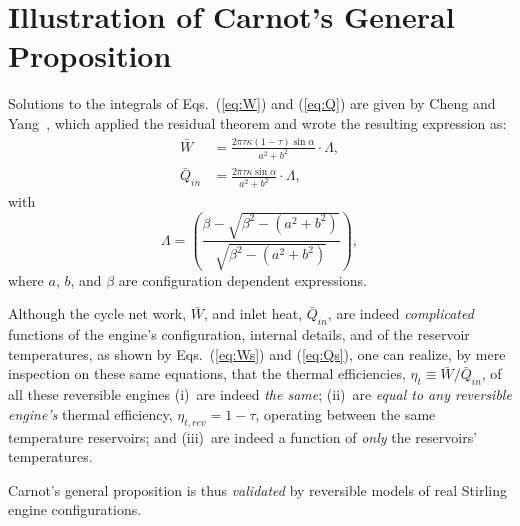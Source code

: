 \section{Illustration of Carnot's General Proposition}

    Solutions to the integrals of Eqs.~(\ref{eq:W}) and (\ref{eq:Q})  are  given  by  Cheng  and
    Yang~\cite{2012-ChengCH+YangHS-ApEnergy}, which applied the residual theorem and  wrote  the
    resulting expression as:
    \begin{align}
        \label{eq:Ws}
        \bar{W} &= \frac{2\pi\tau\kappa(1 - \tau)\sin\alpha}{a^2 + b^2}\cdot\Lambda,\\
        \label{eq:Qs}
        \bar{Q}_{in} &= \frac{2\pi\tau\kappa\sin\alpha}{a^2 + b^2}\cdot\Lambda,
    \end{align}
    \noindent with
    \begin{equation}
        \label{eq:Lamda}
        \Lambda = \left(
                \frac{\beta - \sqrt{\beta^2 - (a^2 + b^2)}}{\sqrt{\beta^2 - (a^2 + b^2)}}
            \right),
    \end{equation}
    \noindent where $a$, $b$, and $\beta$ are configuration dependent expressions.

    Although the  cycle  net  work,  $\bar{W}$,  and  inlet  heat,  $\bar{Q}_{in}$,  are  indeed
    \emph{complicated} functions of the engine's configuration, internal  details,  and  of  the
    reservoir temperatures, as shown by Eqs.~(\ref{eq:Ws}) and (\ref{eq:Qs}), one  can  realize,
    by mere inspection on these same equations, that the thermal  efficiencies,  $\eta_t  \equiv
    \bar{W} / \bar{Q}_{in}$, of all these reversible engines  (i)~are  indeed  \emph{the  same};
    (ii)~are \emph{equal to any reversible engine's} thermal efficiency,  $\eta_{t,rev}  =  1  -
    \tau$, operating between the same temperature reservoirs; and (iii)~are indeed a function of
    \emph{only} the reservoirs' temperatures.

    Carnot's general proposition is thus \emph{validated} by reversible models of real  Stirling
    engine configurations.


